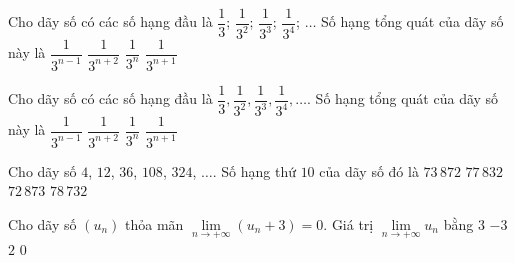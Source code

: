 \begin{ex}%
	Cho dãy số có các số hạng đầu là $\dfrac{1}{3}$; $\dfrac{1}{3^2}$; $\dfrac{1}{3^3}$; $\dfrac{1}{3^4}$; $\ldots$ Số hạng tổng quát của dãy số  này là
	 \choice
		{$\dfrac{1}{3^{n-1}}$} 
		 {$\dfrac{1}{3^{n+2}}$}
		{\True  $\dfrac{1}{3^n}$}
		{$\dfrac{1}{3^{n+1}}$} 
\end{ex}

\begin{ex}%
	 Cho dãy số có các số hạng đầu là $\dfrac{1}{3}, \dfrac{1}{3^2}, \dfrac{1}{3^3}, \dfrac{1}{3^4}, \ldots$. Số hạng tổng quát của dãy số này là
	\choice 
		{ $\dfrac{1}{3^{n-1}}$ } 
		{ $\dfrac{1}{3^{n+2}}$ } 
		{\True  $\dfrac{1}{3^n}$ }
		 { $\dfrac{1}{3^{n+1}}$ }
\end{ex}

\begin{ex}%
	 Cho dãy số $4$, $12$, $36$, $108$, $324$, $\ldots$. Số hạng thứ $10$ của dãy số đó là
	\choice 
		{$73\,872$} 
		{$77\,832$} 
		 {$72\,873$}
		 {\True $78\,732$}
\end{ex}

\begin{ex}%
	Cho dãy số $\left( u_n\right)$ thỏa mãn $\lim\limits_{n\to +\infty} \left(u_n+3\right)=0$. Giá trị $\lim\limits_{n\to +\infty}  u_n$ bằng
	\choice 
		 {$3$}
		 {\True $-3$}
		{$2$} 
		{$0$} 
\end{ex}

